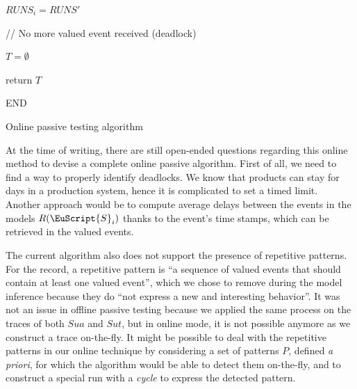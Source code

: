 \begin{algorithm}[h]
{{{{{                        %

                    }%

                }%

            }%

            $RUNS_i = RUNS'$\;\label{algo:check-online:line:runs-i-up}
        }%


    }%

    \BlankLine
    // No more valued event received (deadlock)
    \BlankLine

    $T = \emptyset$\;

    return $T$\;\label{on:l27}

    \BlankLine
    END\;

    \caption{Online passive testing algorithm}
    \label{algo:check-online}
\end{algorithm}

\clearpage

At the time of writing, there are still open-ended questions
regarding this online method to devise a complete online passive
algorithm. First of all, we need to find a way to properly
identify deadlocks. We know that products can stay for days in a
production system, hence it is complicated to set a timed limit.
Another approach would be to compute average delays between the
events in the models $R(\EuScript{S}_i)$ thanks to the event's
time stamps, which can be retrieved in the valued events.

The current algorithm also does not support the presence of
repetitive patterns. For the record, a repetitive pattern is
\enquote{a sequence of valued events that should contain at least
one valued event}, which we chose to remove during the model
inference because they do \enquote{not express a new and
interesting behavior}. It was not an issue in offline passive
testing because we applied the same process on the traces of both
$\mathit{Sua}$ and $\mathit{Sut}$, but in online mode, it is not
possible anymore as we construct a trace on-the-fly. It might be
possible to deal with the repetitive patterns in our online
technique by considering a set of patterns $P$, defined \emph{a
priori}, for which the algorithm would be able to detect them
on-the-fly, and to construct a special run with a \emph{cycle} to
express the detected pattern.

